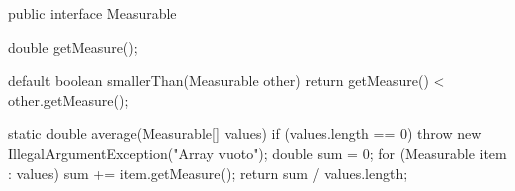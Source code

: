 \begin{unipdcode}[language=Java]
public interface Measurable {
    double getMeasure();

    default boolean smallerThan(Measurable other) {
        return getMeasure() < other.getMeasure();
    }

    static double average(Measurable[] values) {
        if (values.length == 0)
            throw new IllegalArgumentException("Array vuoto");
        double sum = 0;
        for (Measurable item : values)
            sum += item.getMeasure();
        return sum / values.length;
    }
}
\end{unipdcode}

